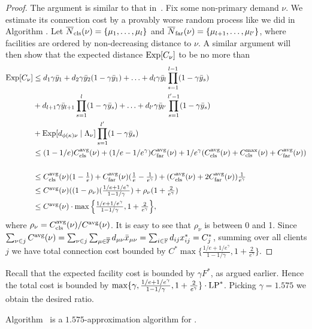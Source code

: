 \begin{proof}
  The argument is similar to that in~\cite{ByrkaGS10}. Fix some
  non-primary demand $\nu$. We estimate its connection cost by a
  provably worse random process like we did in Algorithm {\ECHS}. Let
  ${\overline{N}}_{\text{cls}}(\nu) = \{\mu_1,\ldots,\mu_l\}$ and ${\overline{N}}_{\text{far}}(\nu) =
  \{\mu_{l+1}, \ldots, \mu_{l'}\}$, where facilities are ordered by
  non-decreasing distance to $\nu$. A similar argument will then show
  that the expected distance $\mbox{\rm Exp}[C_\nu]$ to be no more than
  \begin{align*}
    \mbox{\rm Exp}[C_{\nu}] &\leq d_1\gamma{\bar y}_1 +
    d_2\gamma{\bar y}_2(1-\gamma{\bar y}_1) + \ldots +
    d_l\gamma{\bar y}_l\prod_{s=1}^{l-1}(1-\gamma{\bar y}_s) \\
    & + d_{l+1}\gamma{\bar y}_{l+1}\prod_{s=1}^l(1-\gamma{\bar y}_s) + \ldots +
    d_{l'}\gamma{\bar y}_{l'}\prod_{s=1}^{l'-1}(1-\gamma{\bar y}_s) \\
    & + \mbox{\rm Exp}[d_{\phi(\kappa)\nu} \mid \Lambda_\nu]\prod_{s=1}^{l'}(1-\gamma{\bar y}_{s})\\
    &\leq (1-1/e)C_{\text{cls}}^{{\mbox{\scriptsize\rm avg}}}(\nu) + (1/e - 1/e^\gamma)C_{\text{far}}^{{\mbox{\scriptsize\rm avg}}}(\nu) + 1/e^\gamma (C_{\text{cls}}^{{\mbox{\scriptsize\rm avg}}}(\nu) + C_{\text{cls}}^{\max}(\nu) + C_{\text{far}}^{{\mbox{\scriptsize\rm avg}}}(\nu))\\
\\
  &\leq 
	\textstyle
	C_{\text{cls}}^{{\mbox{\scriptsize\rm avg}}}(\nu)(1-\frac{1}{e}) + C_{\text{far}}^{{\mbox{\scriptsize\rm avg}}}(\nu)(\frac{1}{e}-\frac{1}{e^\gamma})
	 			+ (C_{\text{cls}}^{{\mbox{\scriptsize\rm avg}}}(\nu)+2C_{\text{far}}^{{\mbox{\scriptsize\rm avg}}}(\nu))\frac{1}{e^\gamma}
\\
  &\leq
	\textstyle
  C^{{\mbox{\scriptsize\rm avg}}}(\nu)((1-\rho_{\nu})(\frac{1/e+1/e^\gamma}{1-1/\gamma})
  + \rho_{\nu}(1+\frac{2}{e^\gamma}) 
\\
  &\leq 
	\textstyle
	C^{{\mbox{\scriptsize\rm avg}}}(\nu) \cdot \max\Big\{\frac{1/e+1/e^\gamma}{1-1/\gamma},
  								1+\frac{2}{e^\gamma}\Big\},
\end{align*}
%
where $\rho_{\nu}=C_{\text{cls}}^{{\mbox{\scriptsize\rm avg}}}(\nu)/C^{{\mbox{\scriptsize\rm avg}}}(\nu)$. It is easy
to see that $\rho_{\nu}$ is between 0 and 1.
Since $\sum_{\nu\in j} C^{{\mbox{\scriptsize\rm avg}}}(\nu) = \sum_{\nu\in
  j}\sum_{\mu\in\overline{\mathbb{F}}} d_{\mu\nu}{\bar x}_{\mu\nu} =
\sum_{i\in\mathbb{F}} d_{ij}x_{ij}^\ast = C_j^\ast$, summing
over all clients $j$ we have total connection cost bounded
by $C^\ast \max\{\frac{1/e+1/e^\gamma}{1-1/\gamma},
1+\frac{2}{e^\gamma}\}$. 
\end{proof}

Recall that the expected facility cost is bounded by $\gamma F^\ast$,
as argued earlier. Hence the total cost is bounded by $\max\{\gamma,
\frac{1/e+1/e^\gamma}{1-1/\gamma}, 1+\frac{2}{e^\gamma}\}\cdot
\mbox{\rm LP}^\ast$. Picking $\gamma=1.575$ we obtain the desired ratio.


\begin{theorem}\label{thm:ebgs}
  Algorithm~{\EBGS} is a $1.575$-approximation algorithm for \FTFP.
\end{theorem}




